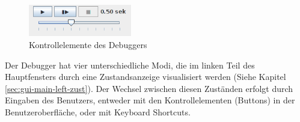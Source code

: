 \begin{figure}[h]
\centering
\includegraphics[width=0.4\textwidth]{./media/images/gui/debugger/ctrl-elements.png}
\caption{Kontrollelemente des Debuggers}
\label{fig:deb-gui-ctrl}
\end{figure}

Der Debugger hat vier unterschiedliche Modi, die im linken Teil des Hauptfensters durch eine Zustandsanzeige visualisiert werden (Siehe Kapitel \ref{sec:gui-main-left-zust}). Der Wechsel zwischen diesen Zuständen erfolgt durch Eingaben des Benutzers, entweder mit den Kontrollelementen (Buttons) in der Benutzeroberfläche, oder mit Keyboard Shortcuts.


